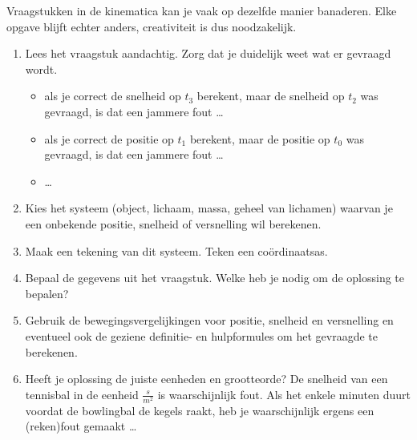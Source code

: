 \documentclass{ximera}
\begin{document}
	\author{Bart Lambregs}
    \xmsource\xmuitleg



Vraagstukken in de kinematica kan je vaak op dezelfde manier banaderen. Elke opgave blijft echter anders, creativiteit is dus noodzakelijk.

\begin{enumerate}
\item Lees het vraagstuk aandachtig. Zorg dat je duidelijk weet wat er gevraagd wordt. 
\begin{itemize}
	\item als je correct de snelheid op \(t_3\) berekent, maar de snelheid op \(t_2\) was gevraagd, is dat een jammere fout \ldots 
	\item als je correct de positie op \(t_1\) berekent, maar de positie op \(t_0\) was gevraagd, is dat een jammere fout \ldots 
	\item \ldots
\end{itemize}
\item Kies het systeem (object, lichaam, massa, geheel van lichamen) waarvan je een onbekende positie, snelheid of versnelling wil berekenen. 
\item Maak een tekening van dit systeem. Teken een coördinaatsas. 
\item Bepaal de gegevens uit het vraagstuk. Welke heb je nodig om de oplossing te bepalen? 
\item Gebruik de bewegingsvergelijkingen voor positie, snelheid en versnelling en eventueel ook de geziene definitie- en hulpformules om het gevraagde te berekenen. 
\item Heeft je oplossing de juiste eenheden en grootteorde? De snelheid van een tennisbal in de eenheid \(\frac{s}{m^2}\) is waarschijnlijk fout. Als het enkele minuten duurt voordat de bowlingbal de kegels raakt, heb je waarschijnlijk ergens een (reken)fout gemaakt \ldots 

\end{enumerate}



\end{document}
